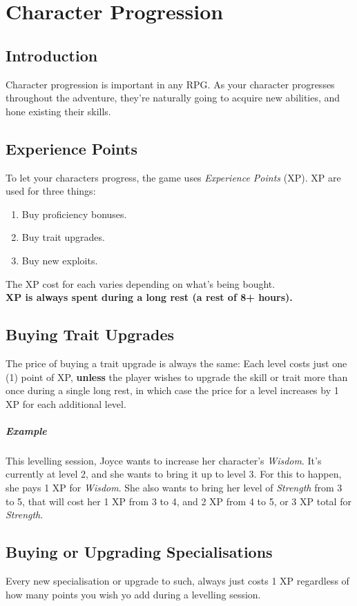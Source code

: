 \chapter{Character Progression}\label{chap:char-prog}
\section{Introduction}
Character progression is important in any RPG.
As your character progresses throughout the adventure, they're naturally going to acquire new abilities, and hone existing their skills.

\section{Experience Points}
To let your characters progress, the game uses \textit{Experience Points} (XP).
XP are used for three things:
\begin{enumerate}
\item Buy proficiency bonuses.
\item Buy trait upgrades.
\item Buy new exploits.
\end{enumerate}
The XP cost for each varies depending on what's being bought.\\
\textbf{XP is always spent during a long rest (a rest of 8+ hours).}

\section{Buying Trait Upgrades}
The price of buying a trait upgrade is always the same:
Each level costs just one (1) point of XP, \textbf{unless} the player wishes to upgrade the skill or trait more than once during a single long rest, in which case the price for a level increases by 1 XP for each additional level.

\paragraph{Example} This levelling session, Joyce wants to increase her character's \textit{Wisdom}. 
It's currently at level 2, and she wants to bring it up to level 3.
For this to happen, she pays 1 XP for \textit{Wisdom}.
She also wants to bring her level of \textit{Strength} from 3 to 5, that will cost her 1 XP from 3 to 4, and 2 XP from 4 to 5, or 3 XP total for \textit{Strength}.

\section{Buying or Upgrading Specialisations}
Every new specialisation or upgrade to such, always just costs 1 XP regardless of how many points you wish yo add during a levelling session.

